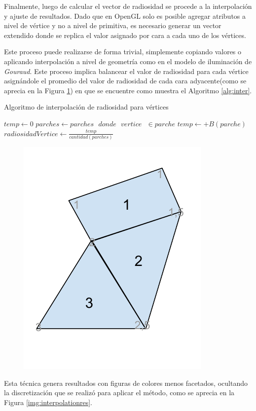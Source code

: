 Finalmente, luego de calcular el vector de radiosidad se procede a la interpolación y ajuste de resultados. Dado que en OpenGL solo es posible agregar atributos a nivel de vértice y no a nivel de primitiva, es necesario generar un vector extendido donde se replica el valor asignado por cara a cada uno de los vértices.

Este proceso puede realizarse de forma trivial, simplemente copiando valores o aplicando interpolación a nivel de geometría como en el modelo de iluminación de \textit{Gouraud}. Este proceso implica balancear el valor de radiosidad para cada vértice asignándole el promedio del valor de radiosidad de cada cara adyacente(como se aprecia en la Figura \ref{img:interpolation}) en que se encuentre como muestra el Algoritmo \ref{alg:inter}.

\begin{algorithm}
	\caption{Algoritmo de interpolación de radiosidad para vértices}
	\label{alg:inter}
	\begin{algorithmic}
				\State $temp \gets 0$
				\State $parches \gets parches\text{ } donde\text{ } vertice\text{ } \in parche$
					\State $temp \gets +B(parche)$
				\EndLoop
				\State $radiosidadVertice \gets \frac{temp}{cantidad(parches)}$
			\EndLoop
		\EndFunction
	\end{algorithmic}
\end{algorithm}

\begin{figure}[htbp!]
	\centering
	\includegraphics[width=.3\linewidth]{assets/Interpolation}
	\label{img:interpolation}
\end{figure}

Esta técnica genera resultados con figuras de colores menos facetados, ocultando la discretización que se realizó para aplicar el método, como se aprecia en la Figura \ref{img:interpolationres}.

